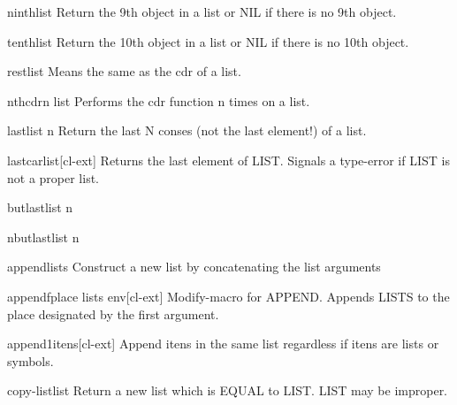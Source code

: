 \documentclass[10pt,english]{book}
\begin{document}
\begin{accessor}{ninth}{list}
  Return the 9th object in a list or NIL if there is no 9th object.
\end{accessor}

\begin{accessor}{tenth}{list}
  Return the 10th object in a list or NIL if there is no 10th object.
\end{accessor}

\begin{accessor}{rest}{list}
  Means the same as the cdr of a list.
\end{accessor}

\begin{function}{nthcdr}{n list}
  Performs the cdr function n times on a list.
\end{function}

\begin{function}{last}{list \op n}
  Return the last N conses (not the last element!) of a list.
\end{function}

\begin{function}{lastcar}{list}[cl-ext]
  Returns the last element of LIST. Signals a type-error if LIST is not a
proper list.
\end{function}

\begin{function}{butlast}{list \op n}
  
\end{function}

\begin{function}{nbutlast}{list \op n}
  
\end{function}

\begin{function}{append}{\rest lists}
  Construct a new list by concatenating the list arguments
\end{function}

\begin{macro}{appendf}{place \rest lists \env env}[cl-ext]
  Modify-macro for APPEND. Appends LISTS to the place designated by the first
argument.
\end{macro}

\begin{function}{append1}{\rest itens}[cl-ext]
  Append itens in the same list regardless if itens are lists or
  symbols.
\end{function}

\begin{function}{copy-list}{list}
  Return a new list which is EQUAL to LIST. LIST may be improper.
\end{function}
\end{document}
